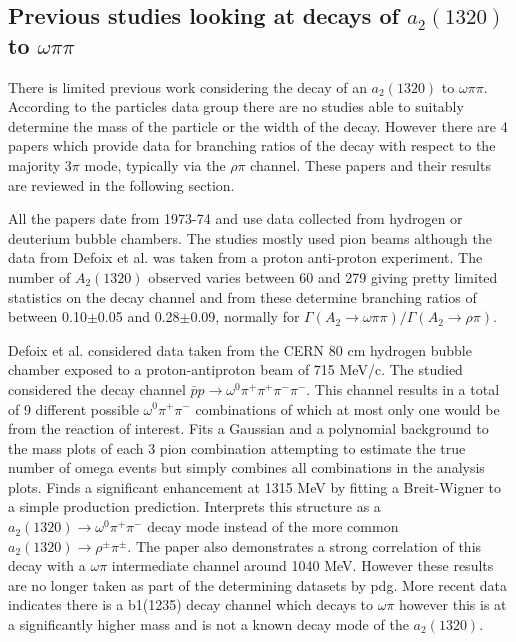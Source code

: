 \subsection{Previous studies looking at decays of $a_2(1320)$ to $\omega\pi\pi$}
There is limited previous work considering the decay of an $a_2(1320)$ to $\omega\pi\pi$. According to the particles data group there are no studies able to suitably determine the mass of the particle or the width of the decay. However there are 4 papers which provide data for branching ratios of the decay with respect to the majority $3\pi$ mode, typically via the $\rho\pi$ channel. These papers and their results are reviewed in the following section.

All the papers date from 1973-74 and use data collected from hydrogen or deuterium bubble chambers. The studies mostly used pion beams although the data from Defoix et al. was taken from a proton anti-proton experiment. The number of $A_2(1320)$ observed varies between 60 and 279 giving pretty limited statistics on the decay channel and from these determine branching ratios of between 0.10$\pm$0.05 and 0.28$\pm$0.09, normally for $\Gamma(A_{2}\rightarrow\omega\pi\pi)/\Gamma(A_{2}\rightarrow\rho\pi)$.

Defoix et al.\cite{defoix1973evidence} considered data taken from the CERN 80 cm hydrogen bubble chamber exposed to a proton-antiproton beam of 715 MeV/c. The studied considered the decay channel $\bar{p}p\rightarrow\omega^0\pi^+\pi^+\pi^-\pi^-$. This channel results in a total of 9 different possible $\omega^0\pi^+\pi^-$ combinations of which at most only one would be from the reaction of interest. Fits a Gaussian and a polynomial background to the mass plots of each 3 pion combination attempting to estimate the true number of omega events but simply combines all combinations in the analysis plots. Finds a significant enhancement at 1315 MeV by fitting a Breit-Wigner to a simple production prediction. Interprets this structure as a $a_2(1320) \rightarrow \omega^0\pi^+\pi^-$ decay mode instead of the more common $a_2(1320) \rightarrow \rho^{\pm}\pi^{\pm}.$ The paper also demonstrates a strong correlation of this decay with a $\omega\pi$ intermediate channel around 1040 MeV. However these results are no longer taken as part of the determining datasets by pdg. More recent data indicates there is a b1(1235) decay channel which decays to $\omega\pi$ however this is at a significantly higher mass and is not a known decay mode of the $a_2(1320)$.

